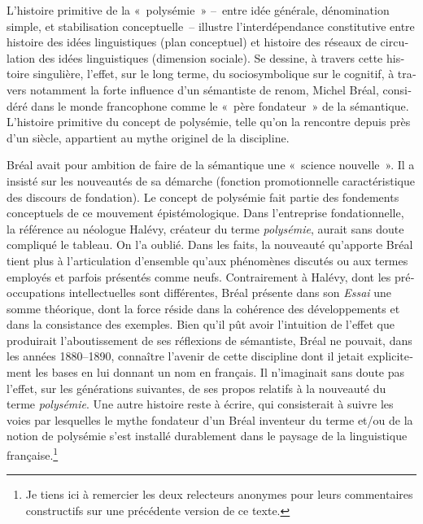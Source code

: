 \documentclass[output=paper]{langsci/langscibook}
\begin{document}
\begin{otherlanguage}{french}
L’histoire primitive de la «~polysémie~» –~entre idée générale, dénomination simple, et stabilisation conceptuelle~– illustre l’interdépendance constitutive entre histoire des idées linguistiques (plan conceptuel) et histoire des réseaux de circulation des idées linguistiques (dimension sociale). Se dessine, à travers cette histoire singulière, l’effet, sur le long terme, du sociosymbolique sur le cognitif, à travers notamment la forte influence d’un sémantiste de renom, Michel Bréal, considéré dans le monde francophone comme le «~père fondateur~» de la sémantique. L’histoire primitive du concept de polysémie, telle qu’on la rencontre depuis près d’un siècle, appartient au mythe originel de la discipline.

Bréal avait pour ambition de faire de la sémantique une «~science nouvelle~». Il a insisté sur les nouveautés de sa démarche (fonction promotionnelle caractéristique des discours de fondation). Le concept de polysémie fait partie des fondements conceptuels de ce mouvement épistémologique. Dans l’entreprise fondationnelle, la référence au néologue Halévy, créateur du terme \textit{polysémie}, aurait sans doute compliqué le tableau. On l’a oublié. Dans les faits, la nouveauté qu’apporte Bréal tient plus à l’articulation d’ensemble qu’aux phénomènes discutés ou aux termes employés et parfois présentés comme neufs. Contrairement à Halévy, dont les préoccupations intellectuelles sont différentes, Bréal présente dans son \textit{Essai} une somme théorique, dont la force réside dans la cohérence des développements et dans la consistance des exemples. Bien qu’il pût avoir l’intuition de l’effet que produirait l’aboutissement de ses réflexions de sémantiste, Bréal ne pouvait, dans les années 1880--1890, connaître l’avenir de cette discipline dont il jetait explicitement les bases en lui donnant un nom en français. Il n’imaginait sans doute pas l’effet, sur les générations suivantes, de ses propos relatifs à la nouveauté du terme \textit{polysémie}. Une autre histoire reste à écrire, qui consisterait à suivre les voies par lesquelles le mythe fondateur d’un Bréal inventeur du terme et/ou de la notion de polysémie s’est installé durablement dans le paysage de la linguistique française.\footnote{Je tiens ici à remercier les deux relecteurs anonymes pour leurs commentaires constructifs sur une précédente version de ce texte.}


\end{otherlanguage}
\end{document}
